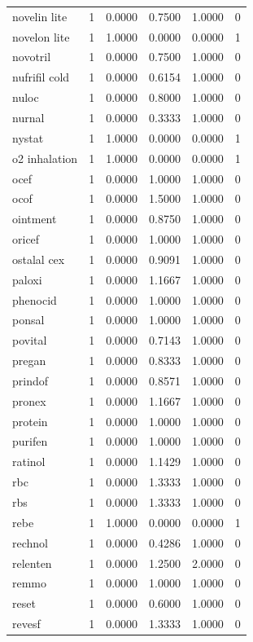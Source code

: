 \begin{longtable}{p{3.0cm}rrrrr}
novelin lite & 1 & 0.0000 & 0.7500 & 1.0000 & 0 \\
novelon lite & 1 & 1.0000 & 0.0000 & 0.0000 & 1 \\
novotril & 1 & 0.0000 & 0.7500 & 1.0000 & 0 \\
nufrifil cold & 1 & 0.0000 & 0.6154 & 1.0000 & 0 \\
nuloc & 1 & 0.0000 & 0.8000 & 1.0000 & 0 \\
nurnal & 1 & 0.0000 & 0.3333 & 1.0000 & 0 \\
nystat & 1 & 1.0000 & 0.0000 & 0.0000 & 1 \\
o2 inhalation & 1 & 1.0000 & 0.0000 & 0.0000 & 1 \\
ocef & 1 & 0.0000 & 1.0000 & 1.0000 & 0 \\
ocof & 1 & 0.0000 & 1.5000 & 1.0000 & 0 \\
ointment & 1 & 0.0000 & 0.8750 & 1.0000 & 0 \\
oricef & 1 & 0.0000 & 1.0000 & 1.0000 & 0 \\
ostalal cex & 1 & 0.0000 & 0.9091 & 1.0000 & 0 \\
paloxi & 1 & 0.0000 & 1.1667 & 1.0000 & 0 \\
phenocid & 1 & 0.0000 & 1.0000 & 1.0000 & 0 \\
ponsal & 1 & 0.0000 & 1.0000 & 1.0000 & 0 \\
povital & 1 & 0.0000 & 0.7143 & 1.0000 & 0 \\
pregan & 1 & 0.0000 & 0.8333 & 1.0000 & 0 \\
prindof & 1 & 0.0000 & 0.8571 & 1.0000 & 0 \\
pronex & 1 & 0.0000 & 1.1667 & 1.0000 & 0 \\
protein & 1 & 0.0000 & 1.0000 & 1.0000 & 0 \\
purifen & 1 & 0.0000 & 1.0000 & 1.0000 & 0 \\
ratinol & 1 & 0.0000 & 1.1429 & 1.0000 & 0 \\
rbc & 1 & 0.0000 & 1.3333 & 1.0000 & 0 \\
rbs & 1 & 0.0000 & 1.3333 & 1.0000 & 0 \\
rebe & 1 & 1.0000 & 0.0000 & 0.0000 & 1 \\
rechnol & 1 & 0.0000 & 0.4286 & 1.0000 & 0 \\
relenten & 1 & 0.0000 & 1.2500 & 2.0000 & 0 \\
remmo & 1 & 0.0000 & 1.0000 & 1.0000 & 0 \\
reset & 1 & 0.0000 & 0.6000 & 1.0000 & 0 \\
revesf & 1 & 0.0000 & 1.3333 & 1.0000 & 0 \\

\end{longtable}
